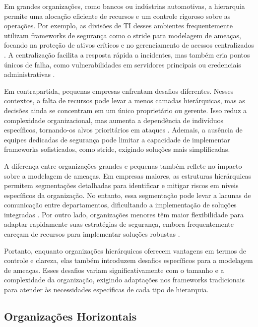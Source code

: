 Em grandes organizações, como bancos ou indústrias automotivas, a
hierarquia permite uma alocação eficiente de recursos e um controle
rigoroso sobre as operações. Por exemplo, as divisões de TI desses
ambientes frequentemente utilizam frameworks de segurança como o
\gls{stride} para modelagem de ameaças, focando na proteção de ativos
críticos e no gerenciamento de acessos centralizados
\cite{ThreatModelingASystematicLiteratureReview}. A centralização facilita
a resposta rápida a incidentes, mas também cria pontos únicos de falha,
como vulnerabilidades em servidores principais ou credenciais
administrativas \cite{DoArtifactsHavePolitics}.

Em contrapartida, pequenas empresas enfrentam desafios diferentes. Nesses
contextos, a falta de recursos pode levar a menos camadas hierárquicas, mas
as decisões ainda se concentram em um único proprietário ou gerente. Isso
reduz a complexidade organizacional, mas aumenta a dependência de
indivíduos específicos, tornando-os alvos prioritários em ataques
\cite{WorkerCooperativesinAmerica}. Ademais, a ausência de equipes
dedicadas de segurança pode limitar a capacidade de implementar frameworks
sofisticados, como \gls{stride}, exigindo soluções mais simplificadas.

A diferença entre organizações grandes e pequenas também reflete no impacto
sobre a modelagem de ameaças. Em empresas maiores, as estruturas
hierárquicas permitem segmentações detalhadas para identificar e mitigar
riscos em níveis específicos da organização. No entanto, essa segmentação
pode levar a lacunas de comunicação entre departamentos, dificultando a
implementação de soluções integradas
\cite{ThreatModelingASystematicLiteratureReview}. Por outro lado,
organizações menores têm maior flexibilidade para adaptar rapidamente suas
estratégias de segurança, embora frequentemente careçam de recursos para
implementar soluções robustas \cite{WorkerCooperativesandRevolution}.

Portanto, enquanto organizações hierárquicas oferecem vantagens em termos
de controle e clareza, elas também introduzem desafios específicos para a
modelagem de ameaças. Esses desafios variam significativamente com o
tamanho e a complexidade da organização, exigindo adaptações nos frameworks
tradicionais para atender às necessidades específicas de cada tipo de
hierarquia.

\subsection{Organizações Horizontais}
\label{sec:organizacoes_horizontais}

